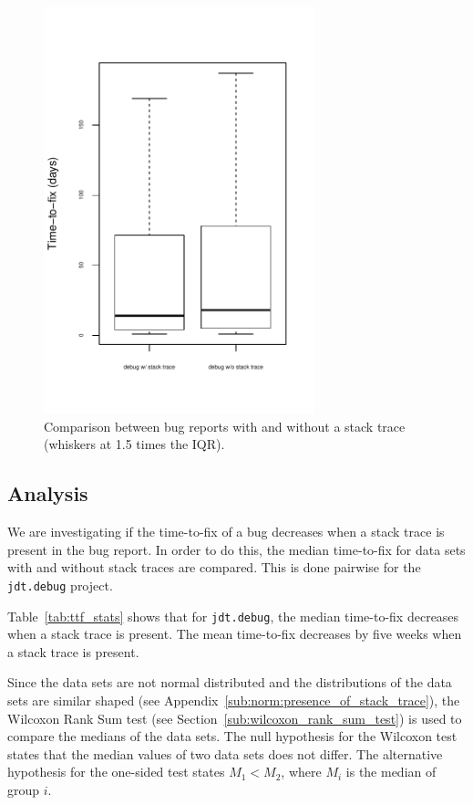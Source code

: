 \begin{figure}[!ht]
	\centering
		\includegraphics[width=0.7\textwidth]{img/ttf_with_without_stacktrace.pdf}
	\caption{Comparison between bug reports with and without a stack trace (whiskers at 1.5 times the IQR).}
	\label{fig:ttf_with_without_stacktrace}
\end{figure}


\subsection{Analysis} %
We are investigating if the time-to-fix of a bug decreases when a stack trace is present in the bug report. In order to do this, the median time-to-fix for data sets with and without stack traces are compared. This is done pairwise for the \texttt{jdt.debug} project.

Table~\ref{tab:ttf_stats} shows that for \texttt{jdt.debug}, the median time-to-fix decreases when a stack trace is present. The mean time-to-fix decreases by five weeks when a stack trace is present.

Since the data sets are not normal distributed and the distributions of the data sets are similar shaped (see Appendix~\ref{sub:norm:presence_of_stack_trace}), the Wilcoxon Rank Sum test (see Section~\ref{sub:wilcoxon_rank_sum_test}) is used to compare the medians of the data sets.
The null hypothesis for the Wilcoxon test states that the median values of two data sets does not differ. The alternative hypothesis for the one-sided test states $M_1 < M_2$, where $M_i$ is the median of group $i$. 

